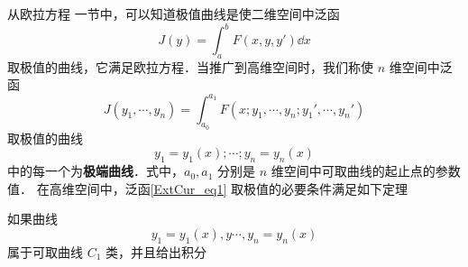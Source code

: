 

从欧拉方程 一节中，可以知道极值曲线是使二维空间中泛函 
\begin{equation}
J(y)=\int_a^b F(x,y,y')\dd x
\end{equation}
取极值的曲线，它满足欧拉方程．当推广到高维空间时，我们称使 $n$ 维空间中泛函 
\begin{equation}\label{ExtCur_eq1}
J(y_1,\cdots, y_n)=\int_{a_0}^{a_1}F(x;y_1,\cdots,y_n;y_1',\cdots,y_n') 
\end{equation}
取极值的曲线 
\begin{equation}
y_1=y_1(x);\cdots;y_n=y_n(x)
\end{equation}
中的每一个为\textbf{极端曲线}．式中，$a_0,a_1$ 分别是 $n$ 维空间中可取曲线的起止点的参数值． 
在高维空间中，泛函\autoref{ExtCur_eq1} 取极值的必要条件满足如下定理
\begin{theorem}{}
如果曲线 
\begin{equation}
y_1=y_1(x),y\cdots,y_n=y_n(x)
\end{equation}
属于可取曲线 $C_1$ 类，并且给出积分
\end{theorem}
